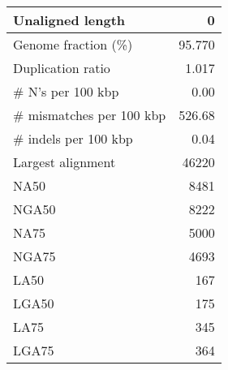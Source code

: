 \documentclass[12pt,a4paper]{article}
\begin{document}
\begin{table}[ht]
\begin{center}
\begin{tabular}{|l*{1}{|r}|}
Unaligned length & 0 \\ \hline
Genome fraction (\%) & 95.770 \\ \hline
Duplication ratio & 1.017 \\ \hline
\# N's per 100 kbp & 0.00 \\ \hline
\# mismatches per 100 kbp & 526.68 \\ \hline
\# indels per 100 kbp & 0.04 \\ \hline
Largest alignment & 46220 \\ \hline
NA50 & 8481 \\ \hline
NGA50 & 8222 \\ \hline
NA75 & 5000 \\ \hline
NGA75 & 4693 \\ \hline
LA50 & 167 \\ \hline
LGA50 & 175 \\ \hline
LA75 & 345 \\ \hline
LGA75 & 364 \\ \hline
\end{tabular}
\end{center}
\end{table}
\end{document}
